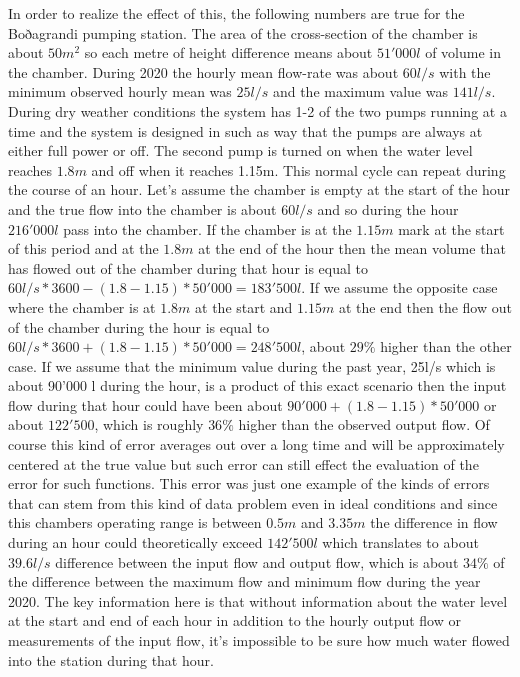 In order to realize the effect of this, the following numbers are true for the Boðagrandi pumping station. The area of the cross-section of the chamber is about $50m^2$ so each metre of height difference means about $51'000 l$ of volume in the chamber. During 2020 the hourly mean flow-rate was about $60l/s$ with the minimum observed hourly mean was $25l/s$ and the maximum value was $141 l/s$. During dry weather conditions the system has 1-2 of the two pumps running at a time and the system is designed in such as way that the pumps are always at either full power or off. The second pump is turned on when the water level reaches $1.8m$ and off when it reaches 1.15m. This normal cycle can repeat during the course of an hour. Let's assume the chamber is empty at the start of the hour and the true flow into the chamber is about $60l/s$ and so during the hour $216'000 l$ pass into the chamber. If the chamber is at the $1.15m$ mark at the start of this period and at the $1.8m$ at the end of the hour then the mean volume that has flowed out of the chamber during that hour is equal to $60 l/s * 3600 - (1.8-1.15) * 50'000 = 183'500 l$. If we assume the opposite case where the chamber is at $1.8m$ at the start and $1.15m$ at the end then the flow out of the chamber during the hour is equal to $60 l/s * 3600 + (1.8-1.15) * 50'000 = 248'500 l$, about $29\%$ higher than the other case. If we assume that the minimum value during the past year, 25l/s which is about 90'000 l during the hour, is a product of this exact scenario then the input flow during that hour could have been about $90'000 + (1.8-1.15)*50'000$ or about $122'500$, which is roughly $36\%$ higher than the observed output flow. Of course this kind of error averages out over a long time and will be approximately centered at the true value but such error can still effect the evaluation of the error for such functions. This error was just one example of the kinds of errors that can stem from this kind of data problem even in ideal conditions and since this chambers operating range is between $0.5m$ and $3.35m$ the difference in flow during an hour could theoretically exceed $142'500l$ which translates to about $39.6l/s$ difference between the input flow and output flow, which is about $34\%$ of the difference between the maximum flow and minimum flow during the year 2020. The key information here is that without information about the water level at the start and end of each hour in addition to the hourly output flow or measurements of the input flow, it's impossible to be sure how much water flowed into the station during that hour. 

